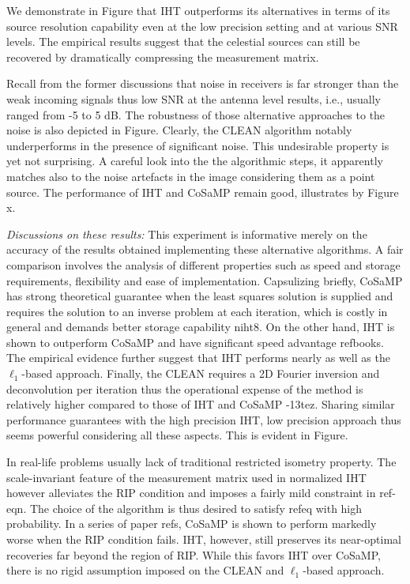 \documentclass{article}
\begin{document}
We demonstrate in Figure that IHT outperforms its alternatives in terms of its source resolution capability even at the low precision setting and at various SNR levels. The empirical results suggest that the celestial sources can still be recovered by dramatically compressing the measurement matrix.

Recall from the former discussions that noise in receivers is far stronger than the weak incoming signals thus low SNR at the antenna level results, i.e., usually ranged from -5 to 5 dB. The robustness of those alternative approaches to the noise is also depicted in Figure. Clearly, the CLEAN algorithm notably underperforms in the presence of significant noise. This undesirable property is yet not surprising. A careful look into the the algorithmic steps, it apparently matches also to the noise artefacts in the image considering them as a point source. The performance of IHT and CoSaMP remain good, illustrates by Figure x.


{\it Discussions on these results:} This experiment is informative merely on the accuracy of the results obtained implementing these alternative algorithms. A fair comparison involves the analysis of different properties such as speed and storage requirements, flexibility and ease of implementation. Capsulizing briefly, CoSaMP has strong theoretical guarantee when the least squares solution is supplied and requires the solution to an inverse problem at each iteration, which is costly in general and demands better storage capability niht8. On the other hand, IHT is shown to outperform CoSaMP and have significant speed advantage refbooks. The empirical evidence further suggest that IHT performs nearly as well as the $\ell_1$-based approach. Finally, the CLEAN requires a 2D Fourier inversion and deconvolution per iteration thus the operational expense of the method is relatively higher compared to those of IHT and CoSaMP -13tez. Sharing similar performance guarantees with the high precision IHT, low precision approach thus seems powerful considering all these aspects. This is evident in Figure.

In real-life problems usually lack of traditional restricted isometry property. The scale-invariant feature of the measurement matrix used in normalized IHT however alleviates the RIP condition and imposes a fairly mild constraint in ref-eqn. The choice of the algorithm is thus desired to satisfy refeq with high probability. In a series of paper refs, CoSaMP is shown to perform markedly worse when the RIP condition fails. IHT, however, still preserves its near-optimal recoveries far beyond the region of RIP. While this favors IHT over CoSaMP, there is no rigid assumption imposed on the CLEAN and $\ell_1$-based approach. 
 
\end{document}
